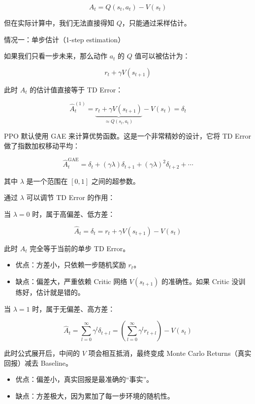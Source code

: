\[
A_t=Q(s_t,a_t)-V(s_t)
\]

但在实际计算中，我们无法直接得知 \(Q\)，只能通过采样估计。

情况一：单步估计（1-step estimation）

如果我们只看一步未来，那么动作 \(a_t\) 的 \(Q\) 值可以被估计为：

\[
r_t+\gamma V(s_{t+1})
\]

此时 \(A_t\) 的估计值直接等于 TD Error：

\[
\hat{A}_t^{(1)}=\underbrace{r_t+\gamma V(s_{t+1})}_{\approx Q(s_t,a_t)}-V(s_t)=\delta_t
\]

PPO 默认使用 GAE 来计算优势函数。这是一个非常精妙的设计，它将 TD Error 做了指数加权移动平均：

\[
\hat{A}_t^{\mathrm{GAE}}
=
\delta_t+(\gamma\lambda)\delta_{t+1}+(\gamma\lambda)^{2}\delta_{t+2}+\cdots
\]

其中 \(\lambda\) 是一个范围在 \([0,1]\) 之间的超参数。

通过 \(\lambda\) 可以调节 TD Error 的作用：

当 \(\lambda=0\) 时，属于高偏差、低方差：

\[
\hat{A}_t=\delta_t=r_t+\gamma V(s_{t+1})-V(s_t)
\]

此时 \(A_t\) 完全等于当前的单步 TD Error。

\begin{itemize}
\tightlist
\item
  优点：方差小，只依赖一步随机奖励 \(r_t\)。
\item
  缺点：偏差大，严重依赖 Critic 网络 \(V(s_{t+1})\) 的准确性。如果 Critic 没训练好，估计就是错的。
\end{itemize}

当 \(\lambda=1\) 时，属于无偏差、高方差：

\[
\hat{A}_t=\sum_{l=0}^{\infty}\gamma^{l}\delta_{t+l}=\left(\sum_{l=0}^{\infty}\gamma^{l}r_{t+l}\right)-V(s_t)
\]

此时公式展开后，中间的 \(V\) 项会相互抵消，最终变成 Monte Carlo Returns（真实回报）减去 Baseline。

\begin{itemize}
\tightlist
\item
  优点：偏差小，真实回报是最准确的``事实''。
\item
  缺点：方差极大，因为累加了每一步环境的随机性。
\end{itemize}

